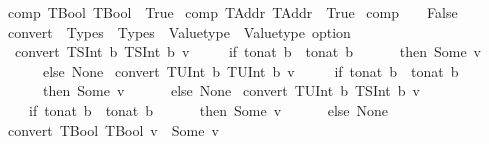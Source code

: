 \begin{isabellebody}
{\isacharbar}{\kern0pt}\ {\isachardoublequoteopen}comp\ TBool\ TBool\ {\isacharequal}{\kern0pt}\ True{\isachardoublequoteclose}\isanewline
{\isacharbar}{\kern0pt}\ {\isachardoublequoteopen}comp\ TAddr\ TAddr\ {\isacharequal}{\kern0pt}\ True{\isachardoublequoteclose}\isanewline
{\isacharbar}{\kern0pt}\ {\isachardoublequoteopen}comp\ {\isacharunderscore}{\kern0pt}\ {\isacharunderscore}{\kern0pt}\ {\isacharequal}{\kern0pt}\ False{\isachardoublequoteclose}\isanewline
\isanewline
\isanewline
{}\isamarkupfalse%
\ convert\ {\isacharcolon}{\kern0pt}{\isacharcolon}{\kern0pt}\ {\isachardoublequoteopen}Types\ {\isasymRightarrow}\ Types\ {\isasymRightarrow}\ Valuetype\ {\isasymRightarrow}\ Valuetype\ option{\isachardoublequoteclose}\isanewline
{}\isanewline
\ \ {\isachardoublequoteopen}convert\ {\isacharparenleft}{\kern0pt}TSInt\ b{}{\isacharparenright}{\kern0pt}\ {\isacharparenleft}{\kern0pt}TSInt\ b{}{\isacharparenright}{\kern0pt}\ v\ {\isacharequal}{\kern0pt}\isanewline
\ \ \ \ {\isacharparenleft}{\kern0pt}if\ to{\isacharunderscore}{\kern0pt}nat\ b{}\ {\isasymle}\ to{\isacharunderscore}{\kern0pt}nat\ b{}\isanewline
\ \ \ \ \ \ then\ Some\ v\isanewline
\ \ \ \ \ \ else\ None{\isacharparenright}{\kern0pt}{\isachardoublequoteclose}\isanewline
{\isacharbar}{\kern0pt}\ {\isachardoublequoteopen}convert\ {\isacharparenleft}{\kern0pt}TUInt\ b{}{\isacharparenright}{\kern0pt}\ {\isacharparenleft}{\kern0pt}TUInt\ b{}{\isacharparenright}{\kern0pt}\ v\ {\isacharequal}{\kern0pt}\isanewline
\ \ \ \ {\isacharparenleft}{\kern0pt}if\ to{\isacharunderscore}{\kern0pt}nat\ b{}\ {\isasymle}\ to{\isacharunderscore}{\kern0pt}nat\ b{}\isanewline
\ \ \ \ \ \ then\ Some\ v\isanewline
\ \ \ \ \ \ else\ None{\isacharparenright}{\kern0pt}{\isachardoublequoteclose}\isanewline
{\isacharbar}{\kern0pt}\ {\isachardoublequoteopen}convert\ {\isacharparenleft}{\kern0pt}TUInt\ b{}{\isacharparenright}{\kern0pt}\ {\isacharparenleft}{\kern0pt}TSInt\ b{}{\isacharparenright}{\kern0pt}\ v\ {\isacharequal}{\kern0pt}\isanewline
\ \ \ \ {\isacharparenleft}{\kern0pt}if\ to{\isacharunderscore}{\kern0pt}nat\ b{}\ {\isacharless}{\kern0pt}\ to{\isacharunderscore}{\kern0pt}nat\ b{}\isanewline
\ \ \ \ \ \ then\ Some\ v\isanewline
\ \ \ \ \ \ else\ None{\isacharparenright}{\kern0pt}{\isachardoublequoteclose}\isanewline
{\isacharbar}{\kern0pt}\ {\isachardoublequoteopen}convert\ TBool\ TBool\ v\ {\isacharequal}{\kern0pt}\ Some\ v{\isachardoublequoteclose}\isanewline

\end{isabellebody}
